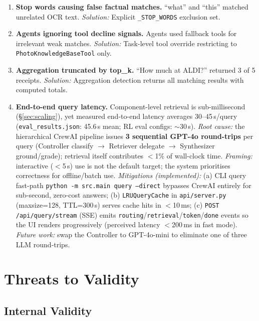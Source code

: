 \documentclass[11pt,letterpaper]{article}
\begin{document}
\begin{enumerate}
  \item \textbf{Stop words causing false factual matches.} ``what'' and ``this'' matched unrelated OCR text. \textit{Solution:} Explicit \texttt{\_STOP\_WORDS} exclusion set.

  \item \textbf{Agents ignoring tool decline signals.} Agents used fallback tools for irrelevant weak matches. \textit{Solution:} Task-level tool override restricting to \texttt{PhotoKnowledgeBaseTool} only.

  \item \textbf{Aggregation truncated by top\_k.} ``How much at ALDI?'' returned 3 of 5 receipts. \textit{Solution:} Aggregation detection returns all matching results with computed totals.

  \item \textbf{End-to-end query latency.} Component-level retrieval is sub-millisecond (\S\ref{sec:scaling}), yet measured end-to-end latency averages 30--45\,s/query (\texttt{eval\_results.json}: 45.6\,s mean; RL eval configs: $\sim$30\,s). \textit{Root cause:} the hierarchical CrewAI pipeline issues \textbf{3 sequential GPT-4o round-trips} per query (Controller classify $\rightarrow$ Retriever delegate $\rightarrow$ Synthesizer ground/grade); retrieval itself contributes $<$1\% of wall-clock time. \textit{Framing:} interactive ($<$5\,s) use is not the default target; the system prioritises correctness for offline/batch use. \textit{Mitigations (implemented):} (a) CLI query fast-path \texttt{python -m src.main query --direct} bypasses CrewAI entirely for sub-second, zero-cost answers; (b) \texttt{LRUQueryCache} in \texttt{api/server.py} (maxsize=128, TTL=300\,s) serves cache hits in $<$10\,ms; (c) \texttt{POST /api/query/stream} (SSE) emits \texttt{routing}/\texttt{retrieval}/\texttt{token}/\texttt{done} events so the UI renders progressively (perceived latency $<$200\,ms in fast mode). \textit{Future work:} swap the Controller to GPT-4o-mini to eliminate one of three LLM round-trips.
\end{enumerate}

\section{Threats to Validity}
\label{sec:threats}

\subsection{Internal Validity}
\end{document}

